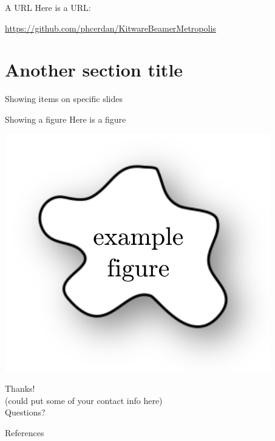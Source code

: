 \documentclass[10pt,aspectratio=169,dvipsnames]{beamer}
\begin{document}
\begin{frame}{A URL}
Here is a URL:

\url{https://github.com/phcerdan/KitwareBeamerMetropolis}
\end{frame}



\section{Another section title}

\begin{frame}{Showing items on specific slides}




\end{frame}

\begin{frame}{Showing a figure}
Here is a figure
\begin{center}
	\includegraphics[scale=1]{figures/example-figure}
\end{center}
\end{frame}




\begin{frame}[standout]
\centering
{\huge Thanks!}\\
(could put some of your contact info here)\\
\vspace{1cm}
{\Huge Questions?}\\
\end{frame}


\begin{frame}[allowframebreaks]{References}
\printbibliography
\end{frame}
\end{document}
